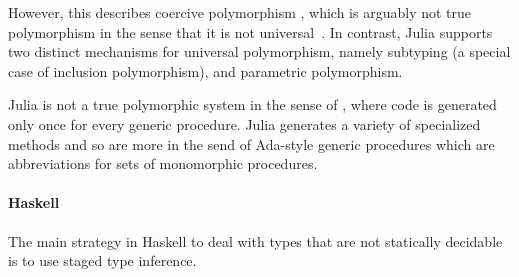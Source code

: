 However, this describes coercive polymorphism \cite{Cardelli1985}, which
is arguably not true polymorphism in the sense that it is not
universal~\cite{Strachey1967,Strachey2000}. In contrast, Julia supports two distinct
mechanisms for universal polymorphism, namely subtyping (a special case of
inclusion polymorphism), and parametric polymorphism.

Julia is not a true polymorphic system in the sense of \cite{Cardelli1985},
where code is generated only once for every generic procedure. Julia generates
a variety of specialized methods and so are more in the send of Ada-style
generic procedures which are abbreviations for sets of monomorphic procedures.


\paragraph{Haskell}

The main strategy in Haskell to deal with types that are not statically decidable is to use staged type
inference.~\cite{Shields1998}

